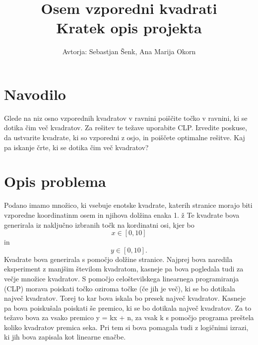 \documentclass[a4, 12pt]{article}
\begin{document}
\title{ Osem vzporedni kvadrati  \\
  \large Kratek opis projekta}

\author{Avtorja: Sebastjan Šenk, Ana Marija Okorn}

\maketitle

\section{Navodilo}

Glede na niz osno vzporednih kvadratov v ravnini poiščite točko v ravnini, ki se dotika čim več kvadratov. Za rešitev te težave uporabite CLP. Izvedite poskuse, da ustvarite kvadrate, ki so vzporedni z osjo, in poiščete optimalne rešitve. Kaj pa iskanje črte, ki se dotika čim več kvadratov? 

\section{Opis problema}



Podano imamo množico, ki vsebuje enotske kvadrate, katerih stranice morajo biti vzporedne koordinatinm osem in njihova dolžina enaka 1.
ž Te kvadrate bova generirala iz naključno izbranih točk na kordinatni osi, kjer bo\[ x \in [0,10]\]  in \[y \in [0,10].\] 
Kvadrate bova generirala s pomočjo dolžine stranice. Najprej bova naredila eksperiment z manjšim številom kvadratom, kasneje pa
bova pogledala tudi za večje množice kvadratov. S pomočjo celoštevilskega linearnega programiranja (CLP) morava poiskati točko 
oziroma točke (če jih je več), ki se bo dotikala največ kvadratov. Torej to kar bova iskala bo presek največ kvadratov. Kasneje 
pa bova poiskušala poiskati še premico, ki se bo dotikala največ kvadratov. Za to težavo bova za vsako premico y = kx + n, za vsak 
k s pomočjo programa preštela koliko kvadratov premica seka. Pri tem si bova pomagala tudi z logičnimi izrazi, ki jih bova zapisala 
kot linearne enačbe.
\end{document}
